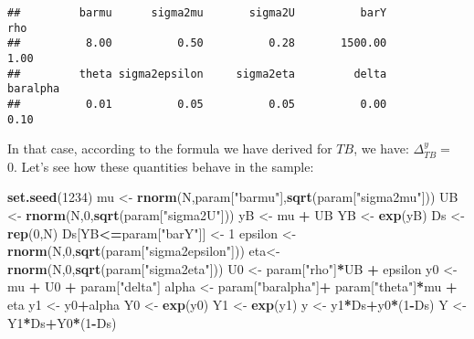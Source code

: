 \documentclass[]{book}
\newenvironment{Shaded}{\begin{snugshade}}{\end{snugshade}}
\newcommand{\DecValTok}[1]{\textcolor[rgb]{0.00,0.00,0.81}{#1}}
\newcommand{\KeywordTok}[1]{\textcolor[rgb]{0.13,0.29,0.53}{\textbf{#1}}}
\newcommand{\NormalTok}[1]{#1}
\newcommand{\OperatorTok}[1]{\textcolor[rgb]{0.81,0.36,0.00}{\textbf{#1}}}
\newcommand{\StringTok}[1]{\textcolor[rgb]{0.31,0.60,0.02}{#1}}
\theoremstyle{definition}
\theoremstyle{definition}
\theoremstyle{definition}
\theoremstyle{remark}
\begin{document}
\begin{verbatim}
##         barmu      sigma2mu       sigma2U          barY           rho 
##          8.00          0.50          0.28       1500.00          1.00 
##         theta sigma2epsilon     sigma2eta         delta      baralpha 
##          0.01          0.05          0.05          0.00          0.10
\end{verbatim}

In that case, according to the formula we have derived for \(TB\), we have: \(\Delta^y_{TB}=\) 0.
Let's see how these quantities behave in the sample:

\begin{Shaded}
\begin{Highlighting}[]
\KeywordTok{set.seed}\NormalTok{(}\DecValTok{1234}\NormalTok{)}
\NormalTok{mu <-}\StringTok{ }\KeywordTok{rnorm}\NormalTok{(N,param[}\StringTok{"barmu"}\NormalTok{],}\KeywordTok{sqrt}\NormalTok{(param[}\StringTok{"sigma2mu"}\NormalTok{]))}
\NormalTok{UB <-}\StringTok{ }\KeywordTok{rnorm}\NormalTok{(N,}\DecValTok{0}\NormalTok{,}\KeywordTok{sqrt}\NormalTok{(param[}\StringTok{"sigma2U"}\NormalTok{]))}
\NormalTok{yB <-}\StringTok{ }\NormalTok{mu }\OperatorTok{+}\StringTok{ }\NormalTok{UB }
\NormalTok{YB <-}\StringTok{ }\KeywordTok{exp}\NormalTok{(yB)}
\NormalTok{Ds <-}\StringTok{ }\KeywordTok{rep}\NormalTok{(}\DecValTok{0}\NormalTok{,N)}
\NormalTok{Ds[YB}\OperatorTok{<=}\NormalTok{param[}\StringTok{"barY"}\NormalTok{]] <-}\StringTok{ }\DecValTok{1} 
\NormalTok{epsilon <-}\StringTok{ }\KeywordTok{rnorm}\NormalTok{(N,}\DecValTok{0}\NormalTok{,}\KeywordTok{sqrt}\NormalTok{(param[}\StringTok{"sigma2epsilon"}\NormalTok{]))}
\NormalTok{eta<-}\StringTok{ }\KeywordTok{rnorm}\NormalTok{(N,}\DecValTok{0}\NormalTok{,}\KeywordTok{sqrt}\NormalTok{(param[}\StringTok{"sigma2eta"}\NormalTok{]))}
\NormalTok{U0 <-}\StringTok{ }\NormalTok{param[}\StringTok{"rho"}\NormalTok{]}\OperatorTok{*}\NormalTok{UB }\OperatorTok{+}\StringTok{ }\NormalTok{epsilon}
\NormalTok{y0 <-}\StringTok{ }\NormalTok{mu }\OperatorTok{+}\StringTok{  }\NormalTok{U0 }\OperatorTok{+}\StringTok{ }\NormalTok{param[}\StringTok{"delta"}\NormalTok{]}
\NormalTok{alpha <-}\StringTok{ }\NormalTok{param[}\StringTok{"baralpha"}\NormalTok{]}\OperatorTok{+}\StringTok{  }\NormalTok{param[}\StringTok{"theta"}\NormalTok{]}\OperatorTok{*}\NormalTok{mu }\OperatorTok{+}\StringTok{ }\NormalTok{eta}
\NormalTok{y1 <-}\StringTok{ }\NormalTok{y0}\OperatorTok{+}\NormalTok{alpha}
\NormalTok{Y0 <-}\StringTok{ }\KeywordTok{exp}\NormalTok{(y0)}
\NormalTok{Y1 <-}\StringTok{ }\KeywordTok{exp}\NormalTok{(y1)}
\NormalTok{y <-}\StringTok{ }\NormalTok{y1}\OperatorTok{*}\NormalTok{Ds}\OperatorTok{+}\NormalTok{y0}\OperatorTok{*}\NormalTok{(}\DecValTok{1}\OperatorTok{-}\NormalTok{Ds)}
\NormalTok{Y <-}\StringTok{ }\NormalTok{Y1}\OperatorTok{*}\NormalTok{Ds}\OperatorTok{+}\NormalTok{Y0}\OperatorTok{*}\NormalTok{(}\DecValTok{1}\OperatorTok{-}\NormalTok{Ds)}
\end{Highlighting}
\end{Shaded}
\end{document}
